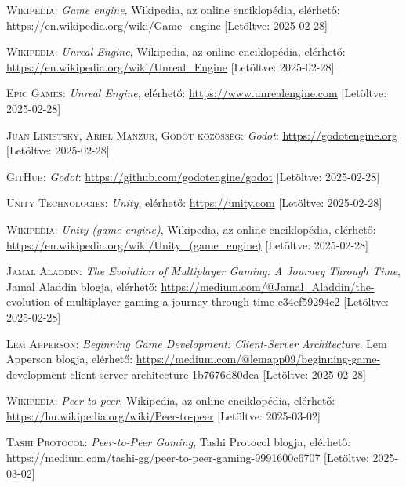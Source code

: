 \documentclass[]{thesis-ekf}
\theoremstyle{definition}
\theoremstyle{remark}
\begin{document}
\begin{thebibliography}{2}
	\textsc{Wikipedia}: \emph{Game engine}, Wikipedia, az online enciklopédia, elérhető: \url{https://en.wikipedia.org/wiki/Game_engine} [Letöltve: 2025-02-28]
	
	\textsc{Wikipedia}: \emph{Unreal Engine}, Wikipedia, az online enciklopédia, elérhető: \url{https://en.wikipedia.org/wiki/Unreal_Engine} [Letöltve: 2025-02-28]

	\textsc{Epic Games}: \emph{Unreal Engine}, elérhető: \url{https://www.unrealengine.com} [Letöltve: 2025-02-28]
	
	\textsc{Juan Linietsky, Ariel Manzur, Godot közösség}: \emph{Godot}: \url{https://godotengine.org} [Letöltve: 2025-02-28]
	
	\textsc{GitHub}: \emph{Godot}: \url{https://github.com/godotengine/godot} [Letöltve: 2025-02-28]
	
	\textsc{Unity Technologies}: \emph{Unity}, elérhető: \url{https://unity.com} [Letöltve: 2025-02-28]
	
	\textsc{Wikipedia}: \emph{Unity (game engine)}, Wikipedia, az online enciklopédia, elérhető: \url{https://en.wikipedia.org/wiki/Unity_(game_engine)} [Letöltve: 2025-02-28]
	
	\textsc{Jamal Aladdin}: \emph{The Evolution of Multiplayer Gaming: A Journey Through Time}, Jamal Aladdin blogja, elérhető:
	\url{https://medium.com/@Jamal_Aladdin/the-evolution-of-multiplayer-gaming-a-journey-through-time-e34ef59294c2} [Letöltve: 2025-02-28]
	
	\textsc{Lem Apperson}: \emph{Beginning Game Development: Client-Server Architecture}, Lem Apperson blogja, elérhető:
	\url{https://medium.com/@lemapp09/beginning-game-development-client-server-architecture-1b7676d80dea} [Letöltve: 2025-02-28]
	
	\textsc{Wikipedia}: \emph{Peer-to-peer}, Wikipedia, az online enciklopédia, elérhető: \url{https://hu.wikipedia.org/wiki/Peer-to-peer} [Letöltve: 2025-03-02]
	
	\textsc{Tashi Protocol}: \emph{Peer-to-Peer Gaming}, Tashi Protocol blogja, elérhető:
	\url{https://medium.com/tashi-gg/peer-to-peer-gaming-9991600c6707} [Letöltve: 2025-03-02]
	

\end{thebibliography}
\end{document}
